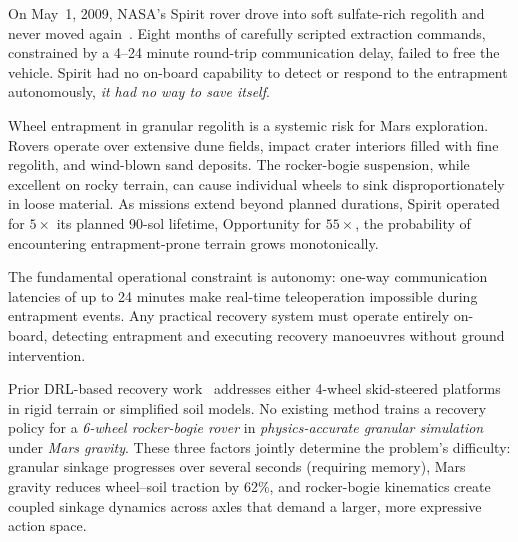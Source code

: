 \documentclass[conference]{IEEEtran}
\begin{document}
On May~1, 2009, NASA's Spirit rover drove into soft sulfate-rich regolith and
never moved again~\cite{arvidson2011spirit}. Eight months of carefully scripted
extraction commands, constrained by a 4--24 minute round-trip communication delay,
failed to free the vehicle. Spirit had no on-board capability to detect or respond
to the entrapment autonomously, \emph{it had no way to save itself}.

Wheel entrapment in granular regolith is a systemic risk for Mars exploration.
Rovers operate over extensive dune fields, impact crater interiors filled with
fine regolith, and wind-blown sand deposits. The rocker-bogie suspension, while
excellent on rocky terrain, can cause individual wheels to sink disproportionately
in loose material. As missions extend beyond planned durations, Spirit operated
for $5\times$ its planned 90-sol lifetime, Opportunity for $55\times$, the
probability of encountering entrapment-prone terrain grows monotonically.

The fundamental operational constraint is autonomy: one-way communication
latencies of up to 24 minutes make real-time teleoperation impossible during
entrapment events. Any practical recovery system must operate entirely on-board,
detecting entrapment and executing recovery manoeuvres without ground intervention.

Prior DRL-based recovery work~\cite{bi2026escape,jain2019} addresses either
4-wheel skid-steered platforms in rigid terrain or simplified soil models. No
existing method trains a recovery policy for a \emph{6-wheel rocker-bogie rover}
in \emph{physics-accurate granular simulation} under \emph{Mars gravity}. These
three factors jointly determine the problem's difficulty: granular sinkage
progresses over several seconds (requiring memory), Mars gravity reduces
wheel--soil traction by 62\%, and rocker-bogie kinematics create coupled sinkage
dynamics across axles that demand a larger, more expressive action space.
\end{document}
